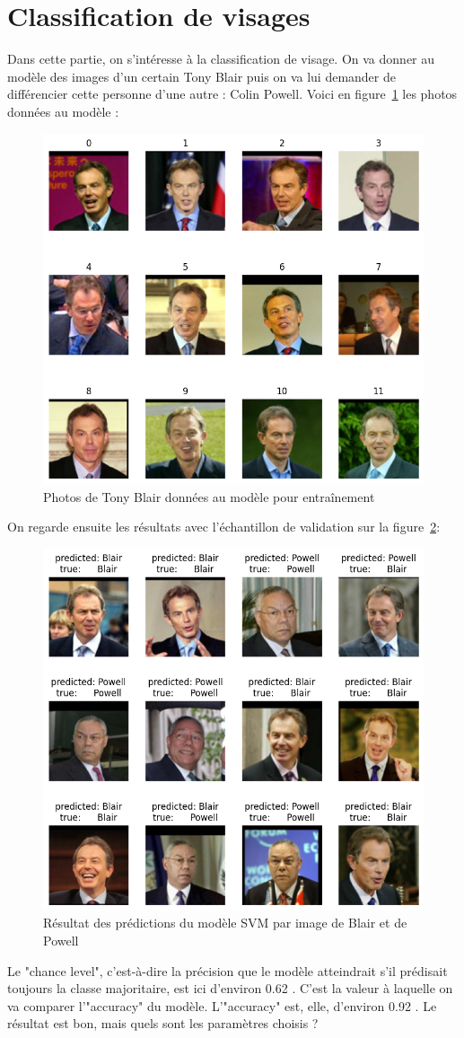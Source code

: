 \documentclass[11pt,a4paper]{article}
\begin{document}
\section*{Classification de visages}
Dans cette partie, on s'intéresse à la classification de visage. On va donner au modèle des images d'un certain Tony Blair puis on va lui demander de différencier cette personne d'une autre : Colin Powell. Voici en figure~\ref{blair} les photos données au modèle :
\begin{figure}[H]
    \centering
    \includegraphics[width=0.5\linewidth]{tony_blair.png}
    \caption{Photos de Tony Blair données au modèle pour entraînement}
    \label{blair}
\end{figure}
On regarde ensuite les résultats avec l'échantillon de validation sur la figure~\ref{blair_or_powell}: \\
\begin{figure}[H]
    \centering
    \includegraphics[width=0.5\linewidth]{blair_or_powell.png}
    \caption{Résultat des prédictions du modèle SVM par image de Blair et de Powell}
    \label{blair_or_powell}
\end{figure}
Le "chance level", c'est-à-dire la précision que le modèle atteindrait s'il prédisait toujours la classe majoritaire, est ici d'environ 0.62 . C'est la valeur à laquelle on va comparer l'"accuracy" du modèle. L'"accuracy" est, elle, d'environ 0.92 . Le résultat est bon, mais quels sont les paramètres choisis ?
\end{document}
